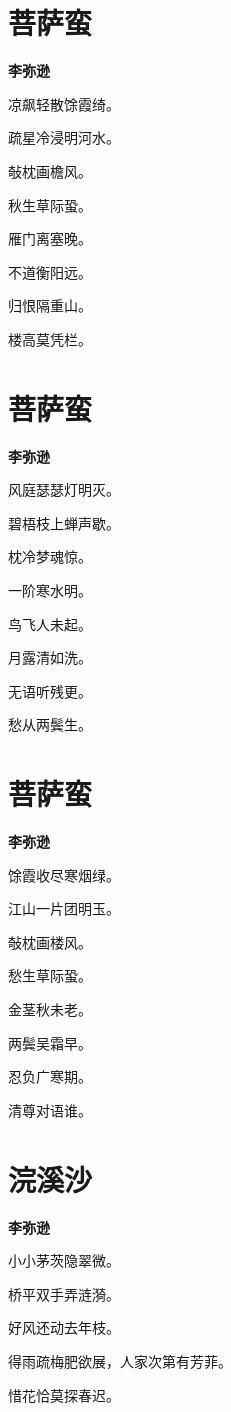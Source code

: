 \documentclass[12pt,a4paper]{ctexbook}
\begin{document}
\section{菩萨蛮}
\textbf{李弥逊}\par\vspace{0.5em}
凉飙轻散馀霞绮。\par
疏星冷浸明河水。\par
敧枕画檐风。\par
秋生草际蛩。\par
雁门离塞晚。\par
不道衡阳远。\par
归恨隔重山。\par
楼高莫凭栏。\par

\section{菩萨蛮}
\textbf{李弥逊}\par\vspace{0.5em}
风庭瑟瑟灯明灭。\par
碧梧枝上蝉声歇。\par
枕冷梦魂惊。\par
一阶寒水明。\par
鸟飞人未起。\par
月露清如洗。\par
无语听残更。\par
愁从两鬓生。\par

\section{菩萨蛮}
\textbf{李弥逊}\par\vspace{0.5em}
馀霞收尽寒烟绿。\par
江山一片团明玉。\par
敧枕画楼风。\par
愁生草际蛩。\par
金茎秋未老。\par
两鬓吴霜早。\par
忍负广寒期。\par
清尊对语谁。\par

\section{浣溪沙}
\textbf{李弥逊}\par\vspace{0.5em}
小小茅茨隐翠微。\par
桥平双手弄涟漪。\par
好风还动去年枝。\par
得雨疏梅肥欲展，人家次第有芳菲。\par
惜花恰莫探春迟。\par
\end{document}
